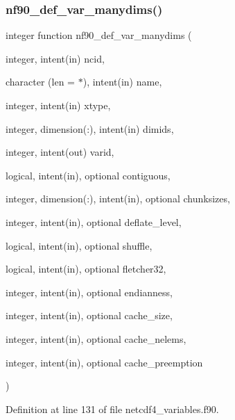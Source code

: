 \subsubsection{\texorpdfstring{nf90\+\_\+def\+\_\+var\+\_\+manydims()}{nf90\_def\_var\_manydims()}}
{\footnotesize\ttfamily integer function nf90\+\_\+def\+\_\+var\+\_\+manydims (\begin{DoxyParamCaption}\item[{integer, intent(in)}]{ncid,  }\item[{character (len = $\ast$), intent(in)}]{name,  }\item[{integer, intent(in)}]{xtype,  }\item[{integer, dimension(\+:), intent(in)}]{dimids,  }\item[{integer, intent(out)}]{varid,  }\item[{logical, intent(in), optional}]{contiguous,  }\item[{integer, dimension(\+:), intent(in), optional}]{chunksizes,  }\item[{integer, intent(in), optional}]{deflate\+\_\+level,  }\item[{logical, intent(in), optional}]{shuffle,  }\item[{logical, intent(in), optional}]{fletcher32,  }\item[{integer, intent(in), optional}]{endianness,  }\item[{integer, intent(in), optional}]{cache\+\_\+size,  }\item[{integer, intent(in), optional}]{cache\+\_\+nelems,  }\item[{integer, intent(in), optional}]{cache\+\_\+preemption }\end{DoxyParamCaption})}



Definition at line 131 of file netcdf4\+\_\+variables.\+f90.

\mbox{\label{netcdf4__variables_8f90_aa7b97046fe9b36f359781ddb7f6ea5c7}} 
